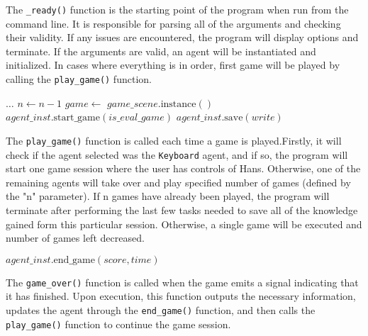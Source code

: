 The \texttt{\_ready()} function is the starting point of the program when run from the command line. It is responsible for parsing all of the arguments and checking their validity. If any issues are encountered, the program will display options and terminate. If the arguments are valid, an agent will be instantiated and initialized. In cases where everything is in order, first game will be played by calling the \texttt{play\_game()} function.

\begin{algorithm}
\begin{algorithmic}[1]
\State $\dots$ 
\State $n \gets n - 1$
\State $game \gets$ $game\_scene.\text{instance}()$
\State {}
\State $agent\_inst.\text{start\_game}(is\_eval\_game)$
\Else
\State $agent\_inst.\text{save}(write)$
\State {}
\EndIf
\EndFunction
\end{algorithmic}
\end{algorithm}

The \texttt{play\_game()} function is called each time a game is played.Firstly, it will check if the agent selected was the \texttt{Keyboard} agent, and if so, the program will start one game session where the user has controls of Hans. Otherwise, one of the remaining agents will take over and play specified number of games (defined by the "n" parameter). If n games have already been played, the program will terminate after performing the last few tasks needed to save all of the knowledge gained form this particular session. Otherwise, a single game will be executed and number of games left decreased.

\begin{algorithm}
\begin{algorithmic}[1]
    \State {}
    \State $agent\_inst.\text{end\_game}(score, time)$
    \State {}
\EndFunction
\end{algorithmic}
\end{algorithm}

The \texttt{game\_over()} function is called when the game emits a signal indicating that it has finished. Upon execution, this function outputs the necessary information, updates the agent through the \texttt{end\_game()} function, and then calls the \texttt{play\_game()} function to continue the game session.